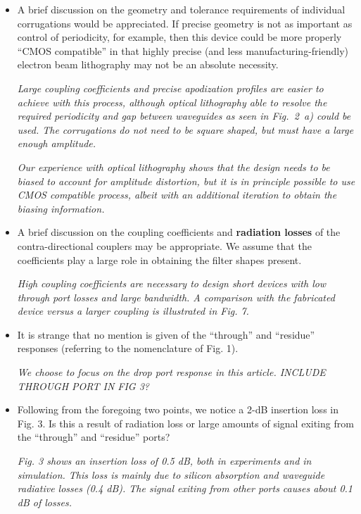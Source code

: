 \documentclass[]{article}
\begin{document}
\begin{itemize}
\item A brief discussion on the geometry and tolerance requirements of individual corrugations would be appreciated. If precise geometry is not as important as control of periodicity, for example, then this device could be more properly “CMOS compatible” in that highly precise (and less manufacturing-friendly) electron beam lithography may not be an absolute necessity.

\emph{Large coupling coefficients and precise apodization profiles are easier to achieve with this process, although optical lithography able to resolve the required periodicity and gap between waveguides as seen in Fig.~2~a) could be used. The corrugations do not need to be square shaped, but must have a large enough amplitude.} 
	
\emph{Our experience with optical lithography shows that the design needs to be biased to account for amplitude distortion, but it is in principle possible to use CMOS compatible process, albeit with an additional iteration to obtain the biasing information.}

\item A brief discussion on the coupling coefficients and \textbf{radiation losses} of the contra-directional couplers may be appropriate. We assume that the coefficients play a large role in obtaining the filter shapes present.

\emph{High coupling coefficients are necessary to design short devices with low through port losses and large bandwidth. A comparison with the fabricated device versus a larger coupling is illustrated in Fig. 7.}

\item It is strange that no mention is given of the “through” and “residue” responses (referring to the nomenclature of Fig. 1).

\emph{We choose to focus on the drop port response in this article. INCLUDE THROUGH PORT IN FIG 3?}

\item Following from the foregoing two points, we notice a 2-dB insertion loss in Fig. 3. Is this a result of radiation loss or large amounts of signal exiting from the “through” and “residue” ports?

\emph{Fig. 3 shows an insertion loss of 0.5 dB, both in experiments and in simulation. This loss is  mainly due to silicon absorption and waveguide radiative losses (0.4 dB). The signal exiting from other ports causes about 0.1 dB of losses.}


\end{itemize}
\end{document}
